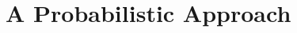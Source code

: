 \documentclass[main.tex]{subfiles}
\begin{document}
\section{A Probabilistic Approach} \label{section:ppm_initial}
\end{document}
